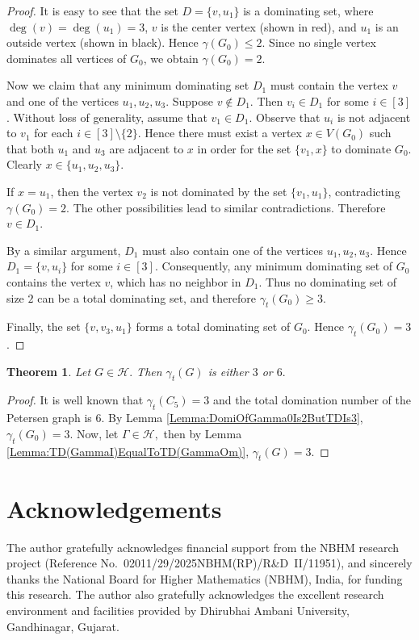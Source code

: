 \documentclass[12pt]{amsart}
\theoremstyle{plain}
\newtheorem{theorem}{Theorem}[section]
\theoremstyle{definition}
\begin{document}
\begin{proof}
It is easy to see that the set $D=\{v,u_1\}$ is a dominating set, where $\deg(v)=\deg(u_1)=3$, $v$ is the center vertex (shown in red), and $u_1$ is an outside vertex (shown in black). Hence $\gamma(G_0)\le 2$. Since no single vertex dominates all vertices of $G_0$, we obtain $\gamma(G_0)=2$.

Now we claim that any minimum dominating set $D_1$ must contain the vertex $v$ and one of the vertices $u_1,u_2,u_3$. Suppose $v\notin D_1$. Then $v_i\in D_1$ for some $i\in[3]$. Without loss of generality, assume that $v_1\in D_1$. Observe that $u_i$ is not adjacent to $v_1$ for each $i\in[3]\setminus\{2\}$. Hence there must exist a vertex $x\in V(G_0)$ such that both $u_1$ and $u_3$ are adjacent to $x$ in order for the set $\{v_1,x\}$ to dominate $G_0$. Clearly $x\in\{u_1,u_2,u_3\}$.

If $x=u_1$, then the vertex $v_2$ is not dominated by the set $\{v_1,u_1\}$, contradicting $\gamma(G_0)=2$. The other possibilities lead to similar contradictions. Therefore $v\in D_1$.

By a similar argument, $D_1$ must also contain one of the vertices $u_1,u_2,u_3$. Hence $D_1=\{v,u_i\}$ for some $i\in[3]$. Consequently, any minimum dominating set of $G_0$ contains the vertex $v$, which has no neighbor in $D_1$. Thus no dominating set of size $2$ can be a total dominating set, and therefore $\gamma_t(G_0)\ge 3$.

Finally, the set $\{v,v_3,u_1\}$ forms a total dominating set of $G_0$. Hence $\gamma_t(G_0)=3$.
\end{proof}


\begin{theorem}\label{Thm:TotalDomOfGamma3;WhenGammaIsaMemberOfH}
Let $G\in \mathcal{H}.$ Then $\gamma_t(G)$ is either $3$ or $6.$    
\end{theorem}
\begin{proof}
It is well known that $\gamma_t(C_5)=3$ and the total domination number of the Petersen graph is $6.$ By Lemma \ref{Lemma:DomiOfGamma0Is2ButTDIs3}, $\gamma_t(G_0)=3.$ Now, let $\Gamma\in \mathcal{H},$ then by Lemma \ref{Lemma:TD(GammaI)EqualToTD(GammaOm)}, $\gamma_t(G)=3.$  
\end{proof}


\section*{Acknowledgements} 
The author gratefully acknowledges financial support from the NBHM research project (Reference No.~02011/29/2025NBHM(RP)/R\&D~II/11951), and sincerely thanks the National Board for Higher Mathematics (NBHM), India, for funding this research. The author also gratefully acknowledges the excellent research environment and facilities provided by Dhirubhai Ambani University, Gandhinagar, Gujarat. 
\end{document}
